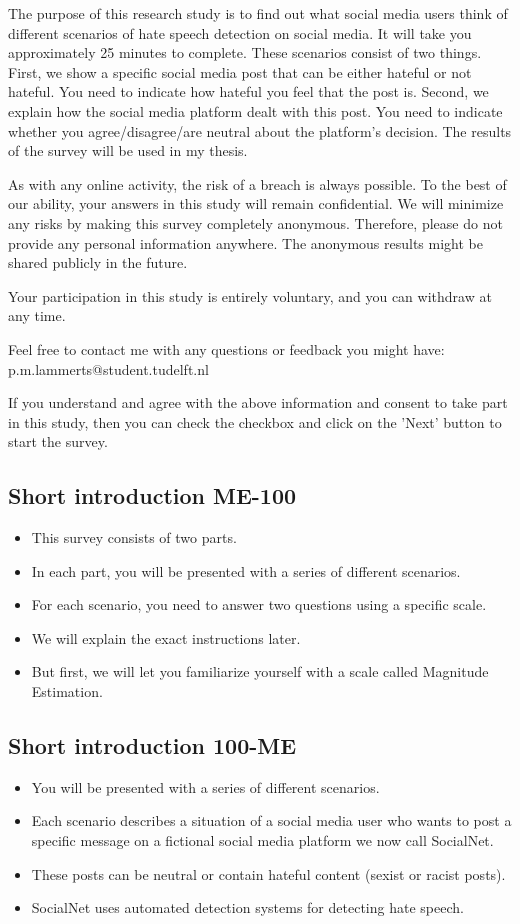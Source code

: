 \documentclass[a4paper]{article}
\begin{document}
The purpose of this research study is to find out what social media users think of different scenarios of hate speech detection on social media. It will take you approximately 25 minutes to complete. These scenarios consist of two things. First, we show a specific social media post that can be either hateful or not hateful. You need to indicate how hateful you feel that the post is. Second, we explain how the social media platform dealt with this post. You need to indicate whether you agree/disagree/are neutral about the platform's decision. The results of the survey will be used in my thesis.

As with any online activity, the risk of a breach is always possible. To the best of our ability, your answers in this study will remain confidential. We will minimize any risks by making this survey completely anonymous. Therefore, please do not provide any personal information anywhere. The anonymous results might be shared publicly in the future.

Your participation in this study is entirely voluntary, and you can withdraw at any time.

Feel free to contact me with any questions or feedback you might have:
p.m.lammerts@student.tudelft.nl

If you understand and agree with the above information and consent to take part in this study, then you can check the checkbox and click on the 'Next' button to start the survey.


\subsection{Short introduction ME-100}
\begin{itemize}
    \item This survey consists of two parts.
    \item In each part, you will be presented with a series of different scenarios.
    \item For each scenario, you need to answer two questions using a specific scale.
    \item We will explain the exact instructions later.
    \item But first, we will let you familiarize yourself with a scale called Magnitude Estimation.
\end{itemize}

\subsection{Short introduction 100-ME}
\begin{itemize}
    \item You will be presented with a series of different scenarios.
    \item Each scenario describes a situation of a social media user who wants to post a specific message on a fictional social media platform we now call SocialNet.
    \item These posts can be neutral or contain hateful content (sexist or racist posts).
    \item SocialNet uses automated detection systems for detecting hate speech.
\end{itemize}
\end{document}
